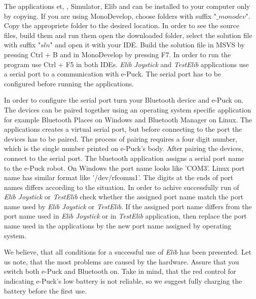 \documentclass[12pt,notitlepage]{report}
\begin{document}
	The applications {\sf et}, {}, {\sf Simulator}, {\sf Elib} and {}
	can be installed to your computer only by copying.
	If you are using MonoDevelop, choose folders with suffix "$\_monodev$". 
	Copy the appropriete folder to the desired location.
	In order to see the source files, build them and run them open the downloaded folder, select the solution file with suffix "$sln$" and open it with your IDE.
	Build the solution file in MSVS by pressing Ctrl + B and in MonoDevelop by pressing F7. 
	In order to run the program use Ctrl + F5 in both IDEs.
	{\it Elib Joystick} and {\it TestElib} applications use a serial port to a communication with e-Puck. 
	The serial port has to be configured before running the applications.

	In order to configure the serial port turn your Bluetooth device and e-Puck on. 
	The devices can be paired together using an operating system specific application 
	for example Bluetooth Places on Windows and Bluetooth Manager on Linux. 
	The applications creates a virtual serial port, but before connecting to the port
	the devices has to be paired.
	The process of pairing requires a four digit number, 
	which is the single number printed on e-Puck's body.
	After pairing the devices, connect to the serial port.
	The bluetooth application assigns a serial port name to the e-Puck robot. 
	On Windows the port name looks like 'COM3'. 
	Linux port name has similar format like '/dev/rfcomm1'.
	The digits at the ends of port names differs according to the situation.
	In order to achive successfully run of {\it Elib Joystick} or {\it TestElib} check
	whether the assigned port name match the port name used by {\it Elib Joystick} or {\it TestElib}.
	If the assigned port name differs from the port name used in {\it Elib Joystick}
	or in {\it TestElib} application, then replace the port name used in the applications by
	the new port name assigned by operating system.

	We believe, that all conditions for a successful use  of {\it Elib} has been presented. 
	Let us note, that the most problems are caused by the hardware.
	Assure that you switch both e-Puck and Bluetooth on. Take in mind, 
	that the red control for indicating e-Puck's low battery is not reliable,
	so we suggest fully charging the battery before the first use.

\end{document}
